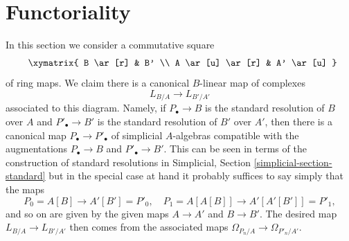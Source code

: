 \documentclass[10pt,a4paper]{amsart}
\theoremstyle{plain}
\theoremstyle{definition}
\theoremstyle{remark}
\numberwithin{equation}{subsection}
\begin{document}
\section{Functoriality}
\label{section-functoriality}

\noindent
In this section we consider a commutative square
\begin{equation}
\label{equation-commutative-square}
\vcenter{
\xymatrix{
B \ar[r] & B' \\
A \ar[u] \ar[r] & A' \ar[u]
}
}
\end{equation}
of ring maps. We claim there is a canonical $B$-linear map of complexes
$$
L_{B/A} \longrightarrow L_{B'/A'}
$$
associated to this diagram. Namely, if $P_\bullet \to B$ is the
standard resolution of $B$ over $A$ and $P'_\bullet \to B'$ is the
standard resolution of $B'$ over $A'$, then there is a canonical map
$P_\bullet \to P'_\bullet$
of simplicial $A$-algebras compatible with the augmentations
$P_\bullet \to B$ and $P'_\bullet \to B'$. This can be seen in terms
of the construction of standard resolutions in
Simplicial, Section \ref{simplicial-section-standard}
but in the special case at hand it probably suffices to say simply
that the maps
$$
P_0 = A[B] \longrightarrow A'[B'] = P'_0,\quad
P_1 = A[A[B]] \longrightarrow A'[A'[B']] = P'_1,
$$
and so on are given by the given maps $A \to A'$ and $B \to B'$.
The desired map $L_{B/A} \to L_{B'/A'}$ then comes from the associated
maps $\Omega_{P_n/A} \to \Omega_{P'_n/A'}$.
\end{document}
